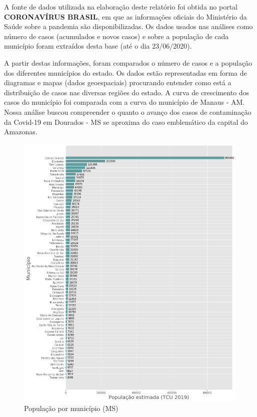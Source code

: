 \documentclass[12pt]{article}
\begin{document}
A fonte de dados utilizada na elaboração deste relatório foi obtida no portal \textbf{CORONAVÍRUS BRASIL}\cite{minsaude}, em que as informações oficiais do Ministério da Saúde sobre a pandemia são disponibilizadas. Os dados usados nas análises como número de casos (acumulados e novos casos) e sobre a população de cada município foram extraídos desta base (até o dia 23/06/2020). 

A partir destas informações, foram comparados o número de casos e a população dos diferentes municípios do estado. Os dados estão representadas em forma de diagramas e mapas (dados geoespaciais) procurando entender como está a distribuição de casos nas diversas regiões do estado. A curva de crescimento dos casos do município foi comparada com a curva do município de Manaus - AM. Nossa análise buscou compreender o quanto o avanço dos casos de contaminação da Covid-19 em Dourados - MS se aproxima do caso emblemático da capital do Amazonas.

\begin{figure}[!htb]
  \centering
  \includegraphics[width=1\textwidth]{figs/pop_por_municipio.png}
  \caption{População por município (MS)}
  \label{fig:popuMuniMS}
  \end{figure}
\end{document}
